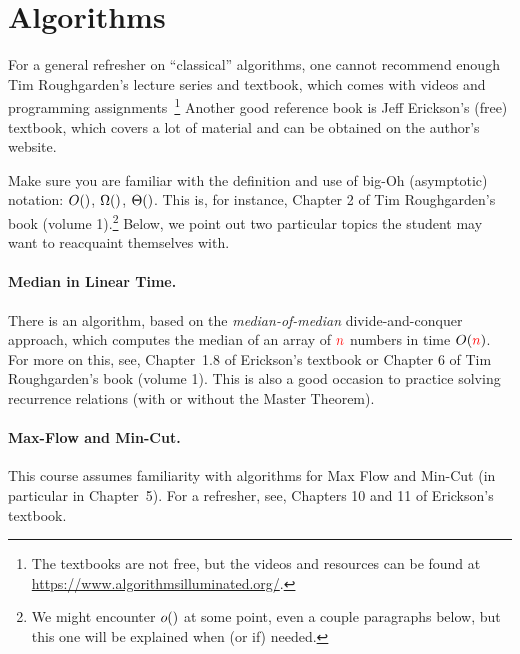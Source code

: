\section{Algorithms}

For a general refresher on ``classical'' algorithms, one cannot recommend enough Tim Roughgarden's lecture series and textbook, which comes with videos and programming assignments~\footnote{The textbooks are not free, but the videos and resources can be found at \url{https://www.algorithmsilluminated.org/}.} Another good reference book is Jeff Erickson's (free) textbook, which covers a lot of material and can be obtained on the author's website.\cite{Erickson2019}

Make sure you are familiar with the definition and use of big-Oh (asymptotic) notation: $\bigO{}$, $\bigOmega{}$, $\bigTheta{}$. This is, for instance, Chapter 2 of Tim Roughgarden's book (volume 1).\footnote{We might encounter $\littleO{}$ at some point, even a couple paragraphs below, but this one will be explained when (or if) needed.} 
Below, we point out two particular topics the student may want to reacquaint themselves with.

\paragraph{Median in Linear Time.}
There is an algorithm, based on the \emph{median-of-median} divide-and-conquer approach, which computes the median of an array of ${\textcolor{red}{n}}$ numbers in time $O({\textcolor{red}{n}})$.
For more on this, see, Chapter~1.8 of Erickson's textbook or Chapter 6 of Tim Roughgarden's book (volume 1). This is also a good occasion to practice solving recurrence relations (with or without the Master Theorem).

\paragraph{Max-Flow and Min-Cut.}
This course assumes familiarity with algorithms for Max Flow and Min-Cut (in particular in Chapter~5). For a refresher, see, Chapters 10 and 11 of Erickson's textbook.

